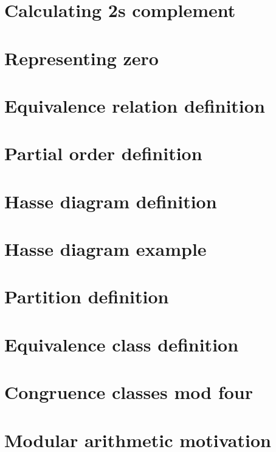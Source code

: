 \section*{Calculating 2s complement}

\vfill
\section*{Representing zero}

\vfill
\section*{Equivalence relation definition}

\vfill
\section*{Partial order definition}

\vfill
\section*{Hasse diagram definition}

\vfill
\section*{Hasse diagram example}

\vfill
\section*{Partition definition}

\vfill
\section*{Equivalence class definition}

\vfill
\section*{Congruence classes mod four}

\vfill
\section*{Modular arithmetic motivation}

\vfill
